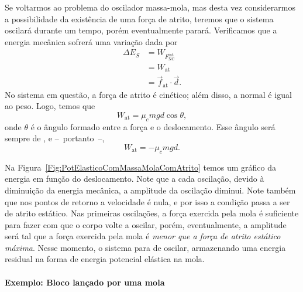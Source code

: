 Se voltarmos ao problema do oscilador massa-mola, mas desta vez considerarmos a possibilidade da existência de uma força de atrito, teremos que o sistema oscilará durante um tempo, porém eventualmente parará. Verificamos que a energia mecânica sofrerá uma variação dada por
\begin{align}
    \Delta E_S &= W_{F_{\textrm{NC}}^{\textrm{int}}} \\
    &= W_{\textrm{at}} \\
    &= \vec{f}_{\textrm{at}} \cdot \vec{d}.
\end{align}
%
No sistema em questão, a força de atrito é cinético; além disso, a normal é igual ao peso. Logo, temos que
\begin{equation}
    W_{\textrm{at}} = \mu_c m g d \cos \theta,
\end{equation}
%
onde $\theta$ é o ângulo formado entre a força e o deslocamento. Esse ângulo será sempre de , e --~portanto~--,
\begin{equation}
    W_{\textrm{at}} = - \mu_c m g d.
\end{equation}

Na Figura~\ref{Fig:PotElasticoComMassaMolaComAtrito} temos um gráfico da energia em função do deslocamento. Note que a cada oscilação, devido à diminuição da energia mecânica, a amplitude da oscilação diminui. Note também que nos pontos de retorno a velocidade é nula, e por isso a condição passa a ser de atrito estático. Nas primeiras oscilações, a força exercida pela mola é suficiente para fazer com que o corpo volte a oscilar, porém, eventualmente, a amplitude será tal que a força exercida pela mola é \emph{menor que a força de atrito estático máxima}. Nesse momento, o sistema para de oscilar, armazenando uma energia residual na forma de energia potencial elástica na mola.

\paragraph{Exemplo: Bloco lançado por uma mola}

